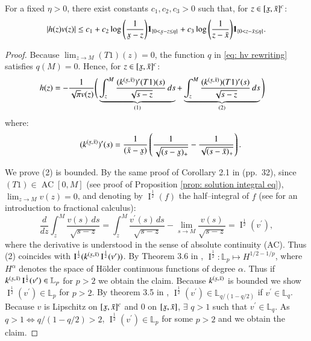 \begin{lemma}
    For a fixed $\eta >0$, there exist constants $c_1,c_2,c_3 >0$ such that, for $z \in [\ubar{x},\bar{x}]^c$:
    \begin{align}\label{eq: bound on h}
       |h(z)v(z)| \leq c_1  + c_2 \log{\left(\frac{1}{\ubar{x}-z}\right)} \ind_{\{ 0<\ubar{x}-z \leq \eta \}} + c_3 \log{\left(\frac{1}{z-\bar{x}}\right)} \ind_{\{0<z-\bar{x} \leq \eta \}}.
    \end{align}
\end{lemma}
\begin{proof}
Because $\lim_{z \rightarrow M}(T 1)(z) =0 $, the function $q$ in \eqref{eq: hv rewriting} satisfies $q(M) =0$. Hence, for $z \in [\ubar{x},\bar{x}]^c$:
\begin{align*}
  &h(z)  = -\frac{1}{\sqrt{\pi}v(z)} \Bigg( \underbrace{\int_{z}^M \frac{(k^{(\ubar{x},\bar{x})})^{\prime} (T1) (s)}{ \sqrt{s-z}} \, ds}_{(1)} + \underbrace{\int_{z}^M \frac{(k^{(\ubar{x},\bar{x})}) (T1)^{\prime} (s)}{ \sqrt{s-z}} \, ds }_{(2)} \Bigg) 
\end{align*}
where:
\begin{align*}
  \quad (k^{(\ubar{x},\bar{x})})^{\prime}(s) = \frac{1}{(\bar{x}-\ubar{x})} \left( \frac{1}{\sqrt{(s-\ubar{x})_{+}}} - \frac{1}{\sqrt{(s-\bar{x})_{+}}}\right).
\end{align*}

We prove (2) is bounded. By the same proof of Corollary 2.1 in \cite{26} (pp.\ 32), since $(T1) \in \operatorname{AC}[0,M]$ (see proof of Proposition \ref{prop: solution integral eq}), $\lim_{z \rightarrow M} v (z) =0 $, and denoting by $\operatorname{I}^{\frac{1}{2}}(f)$ the half--integral of $f$ (see \cite{26} for an introduction to fractional calculus):
$$\frac{d}{dz} \int_{z}^{M} \frac{v(s) \, ds}{\sqrt{s-z}} = \int_{z}^{M} \frac{v^{\prime}(s) \, ds}{\sqrt{s-z}} -  \lim_{s \rightarrow M}\frac{v(s) }{\sqrt{s-z}} = \operatorname{I}^{\frac{1}{2}}(v^{\prime}),$$
where the derivative is understood in the sense of absolute continuity (AC). Thus (2) coincides with $\operatorname{I}^{\frac{1}{2}}(k^{(\ubar{x},\bar{x})} \operatorname{I}^{\frac{1}{2}}(v^{\prime}))$. By Theorem 3.6 in \cite{26}, $\operatorname{I}^{\frac{1}{2}} : \mathbb{L}_p \mapsto H^{1/2 - 1/p}$, where $H^{\alpha}$ denotes the space of Hölder continuous functions of degree $\alpha$. Thus if $k^{(\ubar{x},\bar{x})} \operatorname{I}^{\frac{1}{2}}(v^{\prime}) \in \mathbb{L}_p$ for $p>2$ we obtain the claim. Because $k^{(\ubar{x},\bar{x})}$ is bounded we show $\operatorname{I}^{\frac{1}{2}}(v^{\prime}) \in \mathbb{L}_p$ for $p>2$. By theorem 3.5 in \cite{26},  $\operatorname{I}^{\frac{1}{2}}(v^{\prime}) \in \mathbb{L}_{q/(1-q/2)}$ if $v^{\prime} \in \mathbb{L}_q$. Because $v$ is Lipschitz on $[\ubar{x},\bar{x}]^c$ and $0$ on $[\ubar{x},\bar{x}]$, $ \exists \, \, q >1$ such that $v^{\prime} \in \mathbb{L}_q$. As $q>1 \iff q/(1-q/2) >2$, $\operatorname{I}^{\frac{1}{2}}(v^{\prime}) \in \mathbb{L}_p$ for some $p>2$ and we obtain the claim.


\end{proof}
